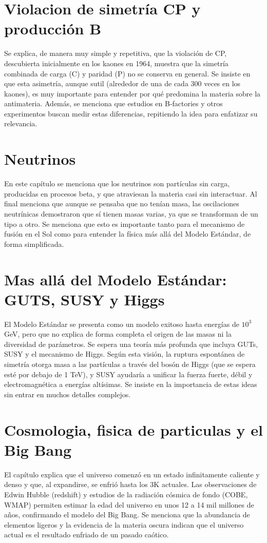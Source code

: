 \documentclass[12pt]{article}
\begin{document}
\section{Violacion de simetría CP y producción B}
Se explica, de manera muy simple y repetitiva, que la violación de CP, descubierta inicialmente en los kaones en 1964, muestra que la simetría combinada de carga (C) y paridad (P) no se conserva en general. Se insiste en que esta asimetría, aunque sutil (alrededor de una de cada 300 veces en los kaones), es muy importante para entender por qué predomina la materia sobre la antimateria. Además, se menciona que estudios en B-factories y otros experimentos buscan medir estas diferencias, repitiendo la idea para enfatizar su relevancia.

\section{Neutrinos}
En este capítulo se menciona que los neutrinos son partículas sin carga, producidas en procesos beta, y que atraviesan la materia casi sin interactuar. Al final menciona que aunque se pensaba que no tenían masa, las oscilaciones neutrínicas demostraron que sí tienen masas varias, ya que se transforman de un tipo a otro. Se menciona que esto es importante tanto para el mecanismo de fusión en el Sol como para entender la física más allá del Modelo Estándar, de forma simplificada.

\section{Mas allá del Modelo Estándar: GUTS, SUSY y Higgs}
El Modelo Estándar se presenta como un modelo exitoso hasta energías de $10^{3}$ GeV, pero que no explica de forma completa el origen de las masas ni la diversidad de parámetros. Se espera una teoría más profunda que incluya GUTs, SUSY y el mecanismo de Higgs. Según esta visión, la ruptura espontánea de simetría otorga masa a las partículas a través del bosón de Higgs (que se espera esté por debajo de 1 TeV), y SUSY ayudaría a unificar la fuerza fuerte, débil y electromagnética a energías altísimas. Se insiste en la importancia de estas ideas sin entrar en muchos detalles complejos.

\section{Cosmologia, fisica de particulas y el Big Bang}
El capítulo explica que el universo comenzó en un estado infinitamente caliente y denso y que, al expandirse, se enfrió hasta los 3K actuales. Las observaciones de Edwin Hubble (redshift) y estudios de la radiación cósmica de fondo (COBE, WMAP) permiten estimar la edad del universo en unos 12 a 14 mil millones de años, confirmando el modelo del Big Bang. Se menciona que la abundancia de elementos ligeros y la evidencia de la materia oscura indican que el universo actual es el resultado enfriado de un pasado caótico.
\end{document}
